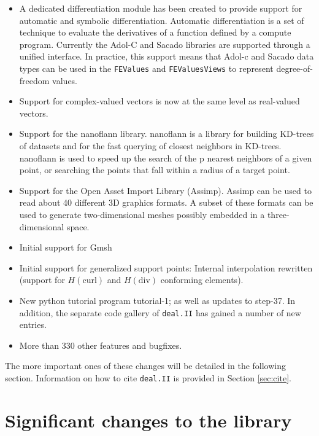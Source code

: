 \documentclass{ansarticle-preprint}
\newcommand{\specialword}[1]{\texttt{#1}}
\newcommand{\dealii}{{\specialword{deal.II}}}
\begin{document}
\begin{itemize}
\item
  A dedicated differentiation module has been created to provide support for
  automatic and symbolic differentiation. Automatic differentiation is a set of
  technique to evaluate the derivatives of a function defined by a compute
  program. Currently the Adol-C and Sacado libraries are supported through a
  unified interface. In practice, this support means that Adol-c and Sacado
  data types can be used in the \texttt{FEValues} and \texttt{FEValuesViews}
  to represent degree-of-freedom values.

\item
  Support for complex-valued vectors is now at the same level as real-valued
  vectors.

\item
  Support for the nanoflann library. nanoflann is a library for building
  KD-trees of datasets and for the fast querying of closest neighbors in
  KD-trees. nanoflann is used to speed up the search of the p nearest neighbors
  of a given point, or searching the points that fall within a radius of a
  target point.

\item
  Support for the Open Asset Import Library (Assimp). Assimp can be used to read
  about 40 different 3D graphics formats. A subset of these formats can be used
  to generate two-dimensional meshes possibly embedded in a three-dimensional
  space.

\item
  Initial support for Gmsh

\item
  Initial support for generalized support points: Internal interpolation
  rewritten (support for $H(\text{curl})$ and $H(\text{div})$ conforming
  elements).

\item New python tutorial program tutorial-1; as well as
  updates to step-37. In addition, the separate code
  gallery of \dealii{} has gained a number of new entries.

  \item More than 330 other features and bugfixes.
\end{itemize}
The more important ones of these changes will be detailed in the
following section.  Information on how to cite \dealii{} is provided
in Section \ref{sec:cite}.



\section{Significant changes to the library}
\end{document}

